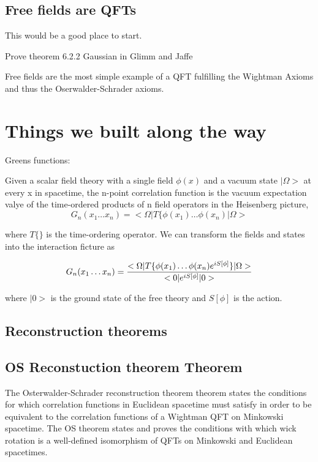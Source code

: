 \documentclass{article}
\begin{document}
\subsection{Free fields are QFTs}

This would be a good place to start.

Prove theorem 6.2.2 Gaussian in Glimm and Jaffe

Free fields are the most simple example of a QFT fulfilling the Wightman Axioms and thus the Oserwalder-Schrader axioms. 

\section{Things we built along the way}

Greens functions:

Given a scalar field theory with a single field $\phi(x) $ and a vacuum state $| \Omega>$ at every x in spacetime, the n-point correlation function is the vacuum expectation valye of the time-ordered products of n field operators in the Heisenberg picture, 
\begin{equation}
    G_n(x_1 \ldots x_n)= < \Omega | T \{ \phi(x_1) \ldots \phi(x_n) | \Omega>
\end{equation}

where $T\{\}$ is the time-ordering operator. We can transform the fields and states into the interaction ficture as 

\begin{equation}
    G_n(x_1 \ldots x_n)={< \Omega|T \{ \phi(x_1) \ldots \phi(x_n) e^{i S[\phi]}
    \} |\Omega> \over <0| e^{i S[\phi]}|0>}
\end{equation}

where $|0>$ is the ground state of the free theory and $S[\phi]$ is the action. 

\subsection{Reconstruction theorems}

\subsection{OS Reconstuction theorem Theorem}\label{OStheorems}

The Osterwalder-Schrader reconstruction theorem  theorem states the conditions for which correlation functions in Euclidean spacetime must satisfy in order to be equivalent to the correlation functions of a Wightman QFT on Minkowski spacetime. The OS theorem states and proves the conditions with which wick rotation is a well-defined isomorphism of QFTs on Minkowski and Euclidean spacetimes. 
\end{document}
